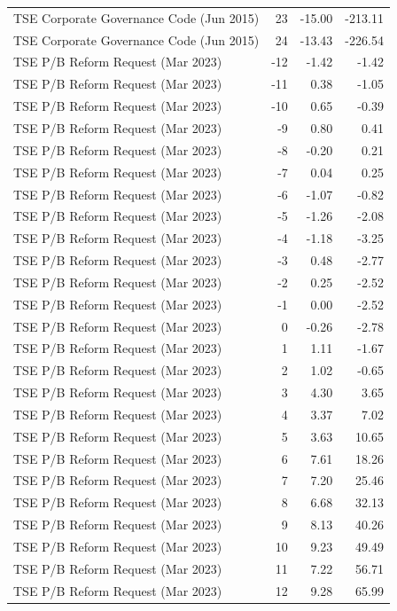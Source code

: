\begin{table}
\begin{tabular}{lrrr}
TSE Corporate Governance Code (Jun 2015) & 23 & -15.00 & -213.11 \\
TSE Corporate Governance Code (Jun 2015) & 24 & -13.43 & -226.54 \\
TSE P/B Reform Request (Mar 2023) & -12 & -1.42 & -1.42 \\
TSE P/B Reform Request (Mar 2023) & -11 & 0.38 & -1.05 \\
TSE P/B Reform Request (Mar 2023) & -10 & 0.65 & -0.39 \\
TSE P/B Reform Request (Mar 2023) & -9 & 0.80 & 0.41 \\
TSE P/B Reform Request (Mar 2023) & -8 & -0.20 & 0.21 \\
TSE P/B Reform Request (Mar 2023) & -7 & 0.04 & 0.25 \\
TSE P/B Reform Request (Mar 2023) & -6 & -1.07 & -0.82 \\
TSE P/B Reform Request (Mar 2023) & -5 & -1.26 & -2.08 \\
TSE P/B Reform Request (Mar 2023) & -4 & -1.18 & -3.25 \\
TSE P/B Reform Request (Mar 2023) & -3 & 0.48 & -2.77 \\
TSE P/B Reform Request (Mar 2023) & -2 & 0.25 & -2.52 \\
TSE P/B Reform Request (Mar 2023) & -1 & 0.00 & -2.52 \\
TSE P/B Reform Request (Mar 2023) & 0 & -0.26 & -2.78 \\
TSE P/B Reform Request (Mar 2023) & 1 & 1.11 & -1.67 \\
TSE P/B Reform Request (Mar 2023) & 2 & 1.02 & -0.65 \\
TSE P/B Reform Request (Mar 2023) & 3 & 4.30 & 3.65 \\
TSE P/B Reform Request (Mar 2023) & 4 & 3.37 & 7.02 \\
TSE P/B Reform Request (Mar 2023) & 5 & 3.63 & 10.65 \\
TSE P/B Reform Request (Mar 2023) & 6 & 7.61 & 18.26 \\
TSE P/B Reform Request (Mar 2023) & 7 & 7.20 & 25.46 \\
TSE P/B Reform Request (Mar 2023) & 8 & 6.68 & 32.13 \\
TSE P/B Reform Request (Mar 2023) & 9 & 8.13 & 40.26 \\
TSE P/B Reform Request (Mar 2023) & 10 & 9.23 & 49.49 \\
TSE P/B Reform Request (Mar 2023) & 11 & 7.22 & 56.71 \\
TSE P/B Reform Request (Mar 2023) & 12 & 9.28 & 65.99 \\

\end{tabular}
\end{table}
